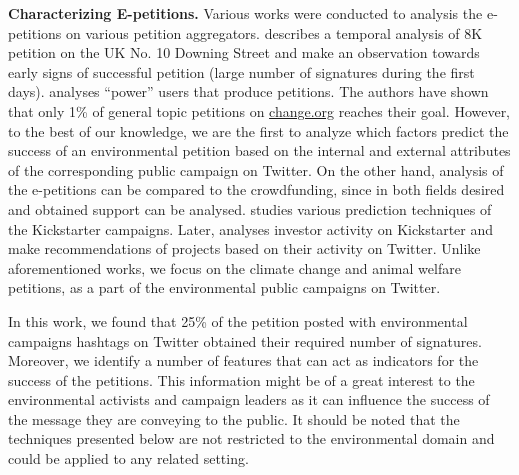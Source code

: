 \textbf{Characterizing E-petitions.} Various works were conducted to analysis the e-petitions on various petition aggregators.
\cite{Hale2013} describes a temporal analysis of 8K petition on the UK No. 10 Downing Street and make an observation towards early signs of successful petition (large number of signatures during the first days).
\cite{Huang2015} analyses ``power'' users that produce petitions. The authors have shown that only 1\% of general topic petitions on \url{change.org} reaches their goal.
However, to the best of our knowledge, we are the first to analyze which factors predict the success of an environmental petition based on the internal and external attributes of the corresponding public campaign on Twitter.
On the other hand, analysis of the e-petitions can be compared to the crowdfunding, since in both fields desired and obtained support can be analysed. \cite{Etter2013} studies various prediction techniques of the Kickstarter campaigns.
Later, \cite{An2014} analyses investor activity on Kickstarter and make recommendations of projects based on their activity on Twitter. Unlike aforementioned works, we focus on the climate change and animal welfare petitions, as a part of the environmental public campaigns on Twitter.


In this work, we found that 25\% of the petition posted with environmental campaigns hashtags on Twitter obtained their required number of signatures.
Moreover, we identify a number of features that can act as indicators for the success of the petitions.
This information might be of a great interest to the environmental activists and campaign leaders as it can influence the success of the message they are conveying to the public.
It should be noted that the techniques presented below are not restricted to the environmental domain and could be applied to any related setting.

